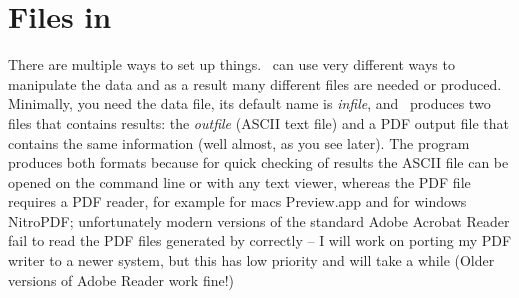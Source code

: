 \chapter{Files in \migrate}


There are multiple ways to set up things. \migrate\ can use very different ways to manipulate the data and as a result many different files are needed or produced. Minimally, you need the data file, its default name is {\textsl{infile}}, and \migrate\ produces two files that contains results: the \textsl{outfile} (ASCII text file) and a PDF output file that contains the same information (well almost, as you see later). The program produces both formats because for quick checking of results the ASCII file can be opened on the command line or with any text viewer, whereas the PDF file requires a PDF reader, for example for macs Preview.app and for windows NitroPDF; unfortunately modern versions of the standard Adobe Acrobat Reader fail to read the PDF files generated by \migrate correctly -- I will work on porting my PDF writer to a newer system, but this has low priority and will take a while (Older versions of Adobe Reader work fine!) 

\vskip 1cm
